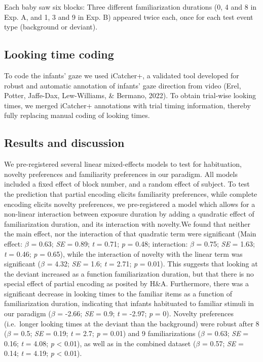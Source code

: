 \documentclass[10pt, letterpaper]{article}
\begin{document}
Each baby saw six blocks: Three different familiarization durations (0,
4 and 8 in Exp. A, and 1, 3 and 9 in Exp. B) appeared twice each, once
for each test event type (background or deviant).

\hypertarget{looking-time-coding}{%
\subsection{Looking time coding}\label{looking-time-coding}}

To code the infants' gaze we used iCatcher+, a validated tool developed
for robust and automatic annotation of infants' gaze direction from
video (Erel, Potter, Jaffe-Dax, Lew-Williams, \& Bermano, 2022). To
obtain trial-wise looking times, we merged iCatcher+ annotations with
trial timing information, thereby fully replacing manual coding of
looking times.

\hypertarget{results-and-discussion-1}{%
\subsection{Results and discussion}\label{results-and-discussion-1}}

We pre-registered several linear mixed-effects models to test for
habituation, novelty preferences and familiarity preferences in our
paradigm. All models included a fixed effect of block number, and a
random effect of subject. To test the prediction that partial encoding
elicits familiarity preferences, while complete encoding elicits novelty
preferences, we pre-registered a model which allows for a non-linear
interaction between exposure duration by adding a quadratic effect of
familiarization duration, and its interaction with novelty.We found that
neither the main effect, nor the interaction of that quadratic term were
significant (Main effect: \(\beta\) = 0.63; \emph{SE} = 0.89; \emph{t} =
0.71; \emph{p} = 0.48; interaction: \(\beta\) = 0.75; \emph{SE} = 1.63;
\emph{t} = 0.46; \emph{p} = 0.65), while the interaction of novelty with
the linear term was significant (\(\beta\) = 4.32; \emph{SE} = 1.6;
\emph{t} = 2.71; \emph{p} = 0.01). This suggests that looking at the
deviant increased as a function familiarization duration, but that there
is no special effect of partial encoding as posited by H\&A.
Furthermore, there was a significant decrease in looking times to the
familiar items as a function of familiarization duration, indicating
that infants habituated to familiar stimuli in our paradigm (\(\beta\) =
-2.66; \emph{SE} = 0.9; \emph{t} = -2.97; \emph{p} = 0). Novelty
preferences (i.e.~longer looking times at the deviant than the
background) were robust after 8 (\(\beta\) = 0.5; \emph{SE} = 0.19;
\emph{t} = 2.7; \emph{p} = 0.01) and 9 familiarizations (\(\beta\) =
0.63; \emph{SE} = 0.16; \emph{t} = 4.08; \emph{p} \textless{} 0.01), as
well as in the combined dataset (\(\beta\) = 0.57; \emph{SE} = 0.14;
\emph{t} = 4.19; \emph{p} \textless{} 0.01).
\end{document}
